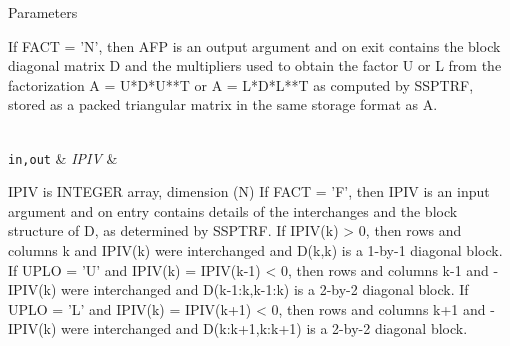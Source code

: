 \begin{DoxyParams}[1]{Parameters}
\begin{DoxyVerb}
          If FACT = 'N', then AFP is an output argument and on exit
          contains the block diagonal matrix D and the multipliers used
          to obtain the factor U or L from the factorization
          A = U*D*U**T or A = L*D*L**T as computed by SSPTRF, stored as
          a packed triangular matrix in the same storage format as A.\end{DoxyVerb}
\\
\hline
\mbox{\tt in,out}  & {\em I\+P\+I\+V} & \begin{DoxyVerb}          IPIV is INTEGER array, dimension (N)
          If FACT = 'F', then IPIV is an input argument and on entry
          contains details of the interchanges and the block structure
          of D, as determined by SSPTRF.
          If IPIV(k) > 0, then rows and columns k and IPIV(k) were
          interchanged and D(k,k) is a 1-by-1 diagonal block.
          If UPLO = 'U' and IPIV(k) = IPIV(k-1) < 0, then rows and
          columns k-1 and -IPIV(k) were interchanged and D(k-1:k,k-1:k)
          is a 2-by-2 diagonal block.  If UPLO = 'L' and IPIV(k) =
          IPIV(k+1) < 0, then rows and columns k+1 and -IPIV(k) were
          interchanged and D(k:k+1,k:k+1) is a 2-by-2 diagonal block.


\end{DoxyVerb}
\end{DoxyParams}
